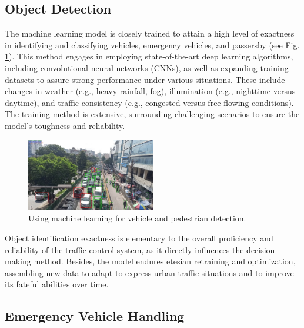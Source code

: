 \documentclass[conference]{IEEEtran}
\begin{document}
\subsection{Object Detection}
The machine learning model is closely trained to attain a high level of exactness in identifying and classifying vehicles, emergency vehicles, and passersby (see Fig. \ref{fig:f2}). This method engages in employing state-of-the-art deep learning algorithms, including convolutional neural networks (CNNs), as well as expanding training datasets to assure strong performance under various situations. These include changes in weather (e.g., heavy rainfall, fog), illumination (e.g., nighttime versus daytime), and traffic consistency (e.g., congested versus free-flowing conditions). The training method is extensive, surrounding challenging scenarios to ensure the model's toughness and reliability. 

\begin{figure}[H]
    \centering
    \includegraphics[width=0.5\textwidth]{8.png} %
    \caption{Using machine learning for vehicle and pedestrian detection.}
    \label{fig:f2}
\end{figure}
Object identification exactness is elementary to the overall proficiency and reliability of the traffic control system, as it directly influences the decision-making method. Besides, the model endures etesian retraining and optimization, assembling new data to adapt to express urban traffic situations and to improve its fateful abilities over time.

\subsection{Emergency Vehicle Handling}
\end{document}
